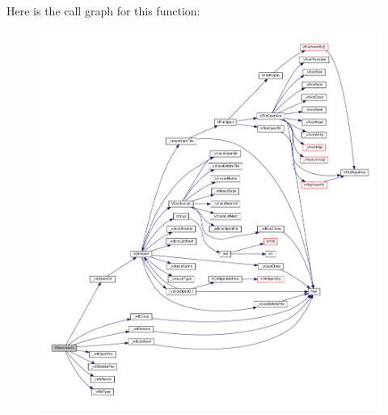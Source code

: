 Here is the call graph for this function\+:
\nopagebreak
\begin{figure}[H]
\begin{center}
\leavevmode
\includegraphics[width=350pt]{vfs-devlist_8c_a36b1aed5737fa71dced20925de25a143_cgraph}
\end{center}
\end{figure}
